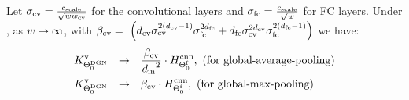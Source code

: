 \begin{theorem}\label{th:mainconv} Let $\sigcnn=\frac{\cscale}{\sqrt{w\wconv}}$ for the convolutional layers and $\sigfc=\frac{\cscale}{\sqrt{w}}$ for FC layers. Under , as $w\ra\infty$, with  $\bcnn = \ \left(\dconv \sigcnn^{2(\dconv-1)}\sigfc^{2\dfc}+\dfc \sigcnn^{2\dconv}\sigfc^{2(\dfc-1)}\right)$ we have:
\begin{align*}
&\kv_{\Tdgn_0}&\ra&\quad \frac{\bcnn}{{\din}^2} \cdot H^{\text{cnn}}_{\Tf_0},\,\,\text{(for global-average-pooling)}\\
&\kv_{\Tdgn_0}&\ra& \quad{\bcnn} \cdot H^{\text{cnn}}_{\Tf_0},\,\,\text{(for global-max-pooling)}\\
\end{align*}
\end{theorem}

